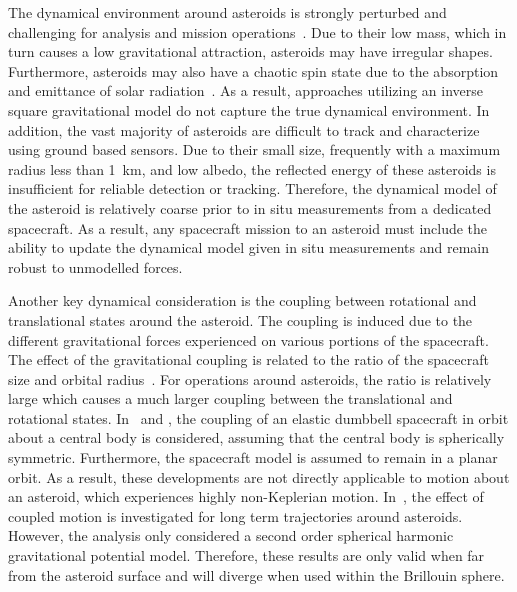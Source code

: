 \documentclass[smallextended]{svjour3}       %
\begin{document}
The dynamical environment around asteroids is strongly perturbed and challenging for analysis and mission operations~\cite{scheeres2012}.
Due to their low mass, which in turn causes a low gravitational attraction, asteroids may have irregular shapes.
Furthermore, asteroids may also have a chaotic spin state due to the absorption and emittance of solar radiation~\cite{rubincam2000}.
As a result, approaches utilizing an inverse square gravitational model do not capture the  true dynamical environment.
In addition, the vast majority of asteroids are difficult to track and characterize using ground based sensors.
Due to their small size, frequently with a maximum radius less than \SI{1}{\kilo\meter}, and low albedo, the reflected energy of these asteroids is insufficient for reliable detection or tracking.
Therefore, the dynamical model of the asteroid is relatively coarse prior to in situ measurements from a dedicated spacecraft.
As a result, any spacecraft mission to an asteroid must include the ability to update the dynamical model given in situ measurements and remain robust to unmodelled forces.

Another key dynamical consideration is the coupling between rotational and translational states around the asteroid.
The coupling is induced due to the different gravitational forces experienced on various portions of the spacecraft. 
The effect of the gravitational coupling is related to the ratio of the spacecraft size and orbital radius~\cite{hughes2004}.
For operations around asteroids, the ratio is relatively large which causes a much larger coupling between the translational and rotational states.
In~\cite{elmasri2005} and \cite{sanyal2004a}, the coupling of an elastic dumbbell spacecraft in orbit about a central body is considered, assuming that the central body is spherically symmetric.
Furthermore, the spacecraft model is assumed to remain in a planar orbit.
As a result, these developments are not directly applicable to motion about an asteroid, which experiences highly non-Keplerian motion.
In~\cite{misra2015b}, the effect of coupled motion is investigated for long term trajectories around asteroids.
However, the analysis only considered a second order spherical harmonic gravitational potential model. 
Therefore, these results are only valid when far from the asteroid surface and will diverge when used within the Brillouin sphere.
\end{document}

